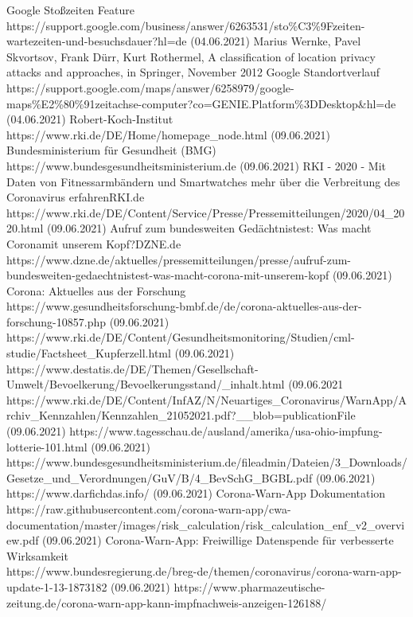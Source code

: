 \documentclass[conference,compsoc]{IEEEtran}
\begin{document}
\begin{thebibliography}{00}
 \glqq Google Stoßzeiten Feature\grqq \\ https://support.google.com/business/answer/6263531/sto\%C3\%9Fzeiten-wartezeiten-und-besuchsdauer?hl=de (04.06.2021)
 Marius Wernke, Pavel Skvortsov, Frank Dürr, Kurt Rothermel,  \glqq A classification of location privacy attacks and approaches\grqq, in Springer, November 2012
 \glqq Google Standortverlauf\grqq \\ https://support.google.com/maps/answer/6258979/google-maps\%E2\%80\%91zeitachse-computer?co=GENIE.Platform\%3DDesktop\&hl=de (04.06.2021)
 \glqq Robert-Koch-Institut\grqq \\ https://www.rki.de/DE/Home/homepage\_node.html (09.06.2021)
 \glqq Bundesministerium für Gesundheit (BMG)\grqq \\ https://www.bundesgesundheitsministerium.de (09.06.2021)
 \glqq RKI - 2020 - Mit Daten von Fitnessarmbändern und Smartwatches mehr über die Verbreitung des Coronavirus erfahren\grqq RKI.de \\ https://www.rki.de/DE/Content/Service/Presse/Pressemitteilungen/2020/04\_2020.html (09.06.2021)
 \glqq Aufruf zum bundesweiten Gedächtnistest: Was macht \glqq Corona\grqq mit unserem Kopf?\grqq DZNE.de \\https://www.dzne.de/aktuelles/pressemitteilungen/presse/aufruf-zum-bundesweiten-gedaechtnistest-was-macht-corona-mit-unserem-kopf (09.06.2021)
 \glqq Corona: Aktuelles aus der Forschung\grqq \\https://www.gesundheitsforschung-bmbf.de/de/corona-aktuelles-aus-der-forschung-10857.php (09.06.2021)
 https://www.rki.de/DE/Content/Gesundheitsmonitoring/Studien/cml-studie/Factsheet\_Kupferzell.html (09.06.2021)
 https://www.destatis.de/DE/Themen/Gesellschaft-Umwelt/Bevoelkerung/Bevoelkerungsstand/\_inhalt.html (09.06.2021
 https://www.rki.de/DE/Content/InfAZ/N/Neuartiges\_Coronavirus/WarnApp/Archiv\_Kennzahlen/Kennzahlen\_21052021.pdf?\_\_blob=publicationFile (09.06.2021)
 https://www.tagesschau.de/ausland/amerika/usa-ohio-impfung-lotterie-101.html (09.06.2021)
 https://www.bundesgesundheitsministerium.de/fileadmin/Dateien/3\_Downloads/Gesetze\_und\_Verordnungen/GuV/B/4\_BevSchG\_BGBL.pdf (09.06.2021)
 https://www.darfichdas.info/ (09.06.2021)
 \glqq Corona-Warn-App Dokumentation\grqq \\https://raw.githubusercontent.com/corona-warn-app/cwa-documentation/master/images/risk\_calculation/risk\_calculation\_enf\_v2\_overview.pdf (09.06.2021)
 \glqq Corona-Warn-App: Freiwillige Datenspende für verbesserte Wirksamkeit\grqq \\https://www.bundesregierung.de/breg-de/themen/coronavirus/corona-warn-app-update-1-13-1873182 (09.06.2021)
https://www.pharmazeutische-zeitung.de/corona-warn-app-kann-impfnachweis-anzeigen-126188/
\end{thebibliography}
\vspace{12pt}
\end{document}
